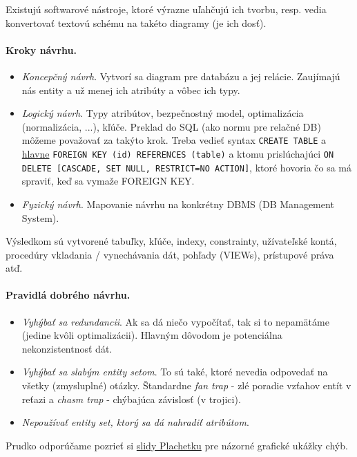 \documentclass[10pt,a4paper]{article}
\begin{document}
Existujú softwarové nástroje, ktoré výrazne uľahčujú ich tvorbu, resp. vedia konvertovať textovú schému na takéto diagramy (je ich dosť).

\paragraph{Kroky návrhu.}
\begin{itemize}
\item \emph{Koncepčný návrh}. Vytvorí sa diagram pre databázu a jej relácie. Zaujímajú nás entity a už menej ich atribúty a vôbec ich typy.
\item \emph{Logický návrh}. Typy atribútov, bezpečnostný model,
optimalizácia (normalizácia, ...), kľúče. Preklad do SQL (ako normu pre
relačné DB) môžeme považovať za takýto krok. Treba vedieť syntax
\verb|CREATE TABLE| a
\href{http://dev.mysql.com/doc/refman/5.5/en/innodb-foreign-key-constraints.html}{hlavne}
{\tt FOREIGN KEY (id) REFERENCES (table)} a ktomu prislúchajúci {\tt ON
DELETE [CASCADE, SET NULL, RESTRICT=NO ACTION]}, ktoré hovoria čo sa má spraviť, keď sa vymaže FOREIGN KEY.
\item \emph{Fyzický návrh}. Mapovanie návrhu na konkrétny DBMS (DB Management System).
\end{itemize}

Výsledkom sú vytvorené tabuľky, kľúče, indexy, constrainty, užívateľské kontá,
procedúry vkladania / vynechávania dát, pohľady (VIEWs), prístupové práva atď.

\paragraph{Pravidlá dobrého návrhu.}
\begin{itemize}
\item \emph{Vyhýbať sa redundancii}. Ak sa dá niečo vypočítať, tak si to nepamätáme (jedine kvôli optimalizácii). Hlavným dôvodom je potenciálna nekonzistentnosť dát.
\item \emph{Vyhýbať sa slabým entity setom}. To sú také, ktoré nevedia odpovedať na všetky (zmysluplné) otázky. Štandardne \emph{fan trap} - zlé poradie vzťahov entít v reťazi  a \emph{chasm trap} - chýbajúca závislosť (v trojici).
\item \emph{Nepoužívať entity set, ktorý sa dá nahradiť atribútom}.
\end{itemize}

Prudko odporúčame pozrieť si
\href{http://www.dcs.fmph.uniba.sk/~plachetk/TEACHING/DB2011/db2011_6.pdf}{slidy Plachetku} pre názorné grafické ukážky chýb.
\end{document}
